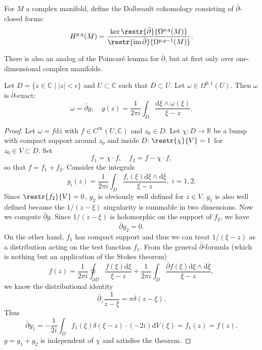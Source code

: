 \documentclass[english,letterpaper]{article}%
\numberwithin{equation}{section}
\numberwithin{figure}{section}
\numberwithin{table}{section}
\theoremstyle{definition}
\theoremstyle{definition}
\theoremstyle{definition}
\theoremstyle{plain}
\theoremstyle{plain}
\theoremstyle{plain}
\theoremstyle{plain}
\theoremstyle{remark}
\theoremstyle{remark}
\newcommand{\bbR}{\mathbb{R}}
\newcommand{\bbC}{\mathbb{C}}
\newcommand{\dd}{{\mathrm{d}}}
\DeclareMathOperator{\im}{im}
\begin{document}
\begin{defn}
    For $M$ a complex manifold, define the Dolbeault cohomology consisting of $\bar\partial$-closed forms:
    \[H^{p,q}(M)=\frac{\ker \restr{\bar\partial}{\Omega^{p,q}(M)}}{\restr{\im\bar\partial}{\Omega^{p,q-1}(M)}}.\]
\end{defn}

There is also an analog of the Poincar\'e lemma for $\bar\partial$, but at first only over one-dimensional complex manifolds.

\begin{lem}
    Let $D=\{z\in\bbC\mid |z|<\epsilon\}$ and $U\mathring\subset \bbC$ such that $\overline{D}\subset U$. Let $\omega\in \Omega^{0,1}(U)$. Then $\omega$ is $\bar\partial$-exact:
    \[\omega=\bar\partial g,\quad g(z)=\frac{1}{2\pi i}\int_{D}\frac{\dd\xi\wedge \omega(\xi)}{\xi-z}.\]
\end{lem}
\begin{proof}
    Let $\omega=f\dd\bar z$ with $f\in C^\infty(U,\bbC)$ and $z_0\in D$. Let $\chi:D\to\bbR$ be a bump with compact support around $z_0$ and inside $D$: $\restr{\chi}{V}=1$ for $z_0\in V\mathring\subset D$. Set
    \[f_1=\chi\cdot f,\quad f_2=f-\chi\cdot f,\]
    so that $f=f_1+f_2$. Consider the integrals
    \[g_i(z)=\frac{1}{2\pi i}\int_{D}\frac{f_i(\xi)\dd\xi\wedge \dd\bar\xi}{\xi-z},\; i=1,2.\]
    Since $\restr{f_2}{V}=0$, $g_2$ is obviously well defined for $z\in V$. $g_1$ is also well defined because the $1/(z-\xi)$ singularity is summable in two dimensions. Now we compute $\bar\partial g$. Since $1/(z-\xi)$ is holomorphic on the support of $f_2$, we have
    \[\bar\partial g_2=0.\]
    On the other hand, $f_1$ has compact support and thus we can treat $1/(\xi-z)$ as a distribution acting on the test function $f_1$. From the general $\bar\partial$-formula (which is nothing but an application of the Stokes theorem)
    \[f(z)=\frac{1}{2\pi i}\oint_{\partial D}\frac{f(\xi)\dd\xi}{\xi-z}+\frac{1}{2\pi i}\int_D\frac{\bar\partial f(\xi)\dd\xi\wedge\dd\bar \xi}{\xi-z},\]
    we know the distributional identity
    \[\bar\partial_z \frac{1}{z-\xi}=\pi\delta(z-\xi).\]
    Thus 
    \[\bar\partial g_1=-\frac{1}{2 i}\int_D f_1(\xi)\delta(\xi-z)\cdot (-2i)\dd V(\xi)=f_1(z)=f(z).\]
    $g=g_1+g_2$ is independent of $\chi$ and satisfies the theorem.
\end{proof}
\end{document}
